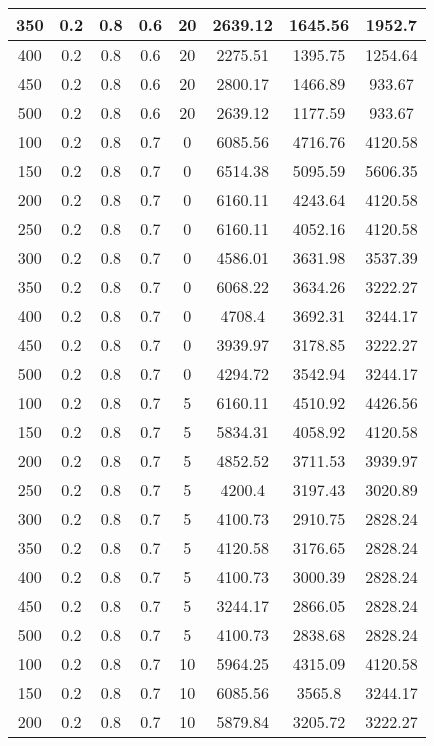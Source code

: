 \documentclass[a4paper, 12pt]{extreport}
\begin{document}
\begin{itemize}
\begin{longtable}{|c|c|c|c|c|c|c|c|}
			350 & 0.2 & 0.8 & 0.6 & 20 & 2639.12 & 1645.56 & 1952.7 \\\hline
			400 & 0.2 & 0.8 & 0.6 & 20 & 2275.51 & 1395.75 & 1254.64 \\\hline
			450 & 0.2 & 0.8 & 0.6 & 20 & 2800.17 & 1466.89 & 933.67 \\\hline
			500 & 0.2 & 0.8 & 0.6 & 20 & 2639.12 & 1177.59 & 933.67 \\\hline
			100 & 0.2 & 0.8 & 0.7 & 0 & 6085.56 & 4716.76 & 4120.58 \\\hline
			150 & 0.2 & 0.8 & 0.7 & 0 & 6514.38 & 5095.59 & 5606.35 \\\hline
			200 & 0.2 & 0.8 & 0.7 & 0 & 6160.11 & 4243.64 & 4120.58 \\\hline
			250 & 0.2 & 0.8 & 0.7 & 0 & 6160.11 & 4052.16 & 4120.58 \\\hline
			300 & 0.2 & 0.8 & 0.7 & 0 & 4586.01 & 3631.98 & 3537.39 \\\hline
			350 & 0.2 & 0.8 & 0.7 & 0 & 6068.22 & 3634.26 & 3222.27 \\\hline
			400 & 0.2 & 0.8 & 0.7 & 0 & 4708.4 & 3692.31 & 3244.17 \\\hline
			450 & 0.2 & 0.8 & 0.7 & 0 & 3939.97 & 3178.85 & 3222.27 \\\hline
			500 & 0.2 & 0.8 & 0.7 & 0 & 4294.72 & 3542.94 & 3244.17 \\\hline
			100 & 0.2 & 0.8 & 0.7 & 5 & 6160.11 & 4510.92 & 4426.56 \\\hline
			150 & 0.2 & 0.8 & 0.7 & 5 & 5834.31 & 4058.92 & 4120.58 \\\hline
			200 & 0.2 & 0.8 & 0.7 & 5 & 4852.52 & 3711.53 & 3939.97 \\\hline
			250 & 0.2 & 0.8 & 0.7 & 5 & 4200.4 & 3197.43 & 3020.89 \\\hline
			300 & 0.2 & 0.8 & 0.7 & 5 & 4100.73 & 2910.75 & 2828.24 \\\hline
			350 & 0.2 & 0.8 & 0.7 & 5 & 4120.58 & 3176.65 & 2828.24 \\\hline
			400 & 0.2 & 0.8 & 0.7 & 5 & 4100.73 & 3000.39 & 2828.24 \\\hline
			450 & 0.2 & 0.8 & 0.7 & 5 & 3244.17 & 2866.05 & 2828.24 \\\hline
			500 & 0.2 & 0.8 & 0.7 & 5 & 4100.73 & 2838.68 & 2828.24 \\\hline
			100 & 0.2 & 0.8 & 0.7 & 10 & 5964.25 & 4315.09 & 4120.58 \\\hline
			150 & 0.2 & 0.8 & 0.7 & 10 & 6085.56 & 3565.8 & 3244.17 \\\hline
			200 & 0.2 & 0.8 & 0.7 & 10 & 5879.84 & 3205.72 & 3222.27 \\\hline

\end{longtable}
\end{itemize}
\end{document}
